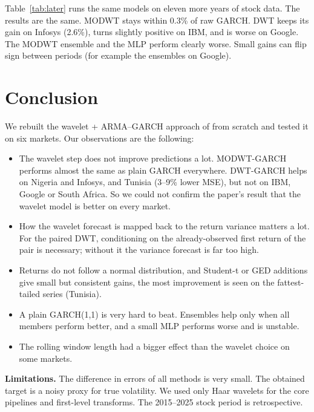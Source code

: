 \documentclass{article}
\begin{document}
Table~\ref{tab:later} runs the same models on eleven more years of stock data. The results are the same. MODWT stays within 0.3\% of raw GARCH. DWT keeps its gain on Infosys (2.6\%), turns slightly positive on IBM, and is worse on Google. The MODWT ensemble and the MLP perform clearly worse. Small gains can flip sign between periods (for example the ensembles on Google).

\section{Conclusion}
\label{sec:conc}

We rebuilt the wavelet + ARMA--GARCH approach of \citet{ismail2016} from scratch and tested it  on six markets. Our observations are the following:
\begin{itemize}
\item The wavelet step does not improve predictions a lot. MODWT-GARCH performs almost the same as plain GARCH everywhere. DWT-GARCH helps on Nigeria and Infosys, and Tunisia (3--9\% lower MSE), but not on IBM, Google or South Africa. So we could not confirm the paper's result that the wavelet model is better on every market.
\item How the wavelet forecast is mapped back to the return variance matters a lot. For the paired DWT, conditioning on the already-observed first return of the pair is necessary; without it the variance forecast is far too high.
\item Returns do not follow a normal distribution, and Student-t or GED additions give small but consistent gains, the most improvement is seen on the fattest-tailed series (Tunisia).
\item A plain GARCH(1,1) is very hard to beat. Ensembles help only when all members perform better, and a small MLP performs worse and is unstable.
\item The rolling window length had a bigger effect than the wavelet choice on some markets.
\end{itemize}

\textbf{Limitations.} The difference in errors of all methods is very small. The obtained target is a noisy proxy for true volatility. We used only Haar wavelets for the core pipelines and first-level transforms. The 2015--2025 stock period is retrospective.
\end{document}
